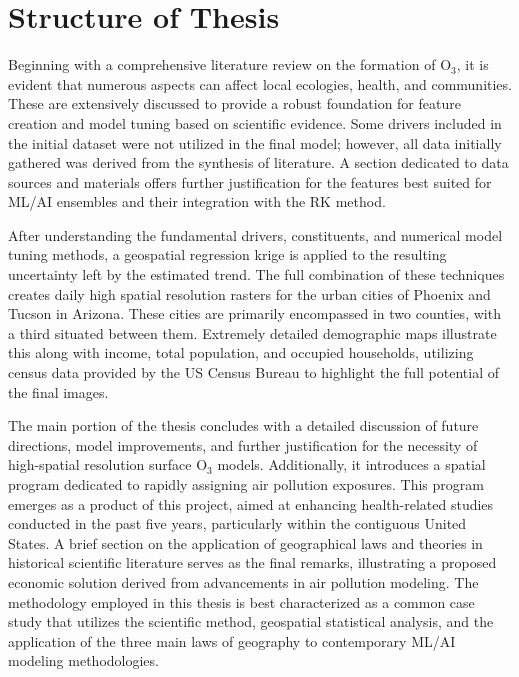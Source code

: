 \section{Structure of Thesis} \label{introchap:structure} Beginning with a comprehensive literature review on the formation of O$_3$, it is evident that numerous aspects can affect local ecologies, health, and communities. These are extensively discussed to provide a robust foundation for feature creation and model tuning based on scientific evidence. Some drivers included in the initial dataset were not utilized in the final model; however, all data initially gathered was derived from the synthesis of literature. A section dedicated to data sources and materials offers further justification for the features best suited for ML/AI ensembles and their integration with the RK method. 

After understanding the fundamental drivers, constituents, and numerical model tuning methods, a geospatial regression krige is applied to the resulting uncertainty left by the estimated trend. The full combination of these techniques creates daily high spatial resolution rasters for the urban cities of Phoenix and Tucson in Arizona. These cities are primarily encompassed in two counties, with a third situated between them. Extremely detailed demographic maps illustrate this along with income, total population, and occupied households, utilizing census data provided by the US Census Bureau to highlight the full potential of the final images. 

The main portion of the thesis concludes with a detailed discussion of future directions, model improvements, and further justification for the necessity of high-spatial resolution surface O$_3$ models. Additionally, it introduces a spatial program dedicated to rapidly assigning air pollution exposures. This program emerges as a product of this project, aimed at enhancing health-related studies conducted in the past five years, particularly within the contiguous United States. A brief section on the application of geographical laws and theories in historical scientific literature serves as the final remarks, illustrating a proposed economic solution derived from advancements in air pollution modeling. The methodology employed in this thesis is best characterized as a common case study that utilizes the scientific method, geospatial statistical analysis, and the application of the three main laws of geography to contemporary ML/AI modeling methodologies.